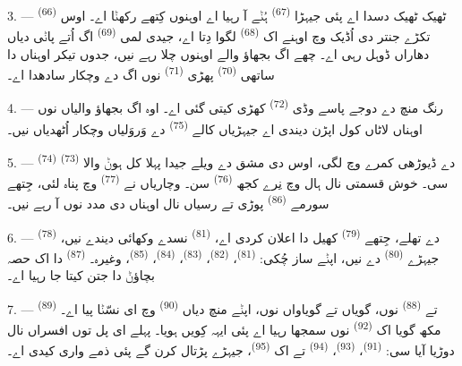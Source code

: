 3. ---  \textsuperscript{(66)} ٹھیک ٹھیک دسدا اے پئی جیہڑا
 \textsuperscript{(67)} ہُݨے آ رہیا اے اوہنوں کِتھے رکھݨا اے۔ اوس
تکڑے جنتر دی اُڈیک وچ اوہنے اک  \textsuperscript{(68)} لگوا دِتا
اے، جیدی لمی  \textsuperscript{(69)} اگ اُتے پاݨی دیاں دھاراں ڈوہل رہی
اے۔ چھے اگ بجھاؤ والے اوہنوں چلا رہے نیں، جدوں تیکر اوہناں دا ساتھی 
\textsuperscript{(70)} پھڑی  \textsuperscript{(71)} نوں اگ دے وچکار
سادھدا اے۔

4. --- رنگ منچ دے دوجے پاسے وڈی  \textsuperscript{(72)} کھڑی کیتی گئی
اے۔ اوہ اگ بجھاؤ والیاں نوں اوہناں لاٹاں کول اپڑن دیندی اے جیہڑیاں کالے
 \textsuperscript{(75)} دے وَروَلیاں وچکار اُٹھدیاں نیں۔

\VUsaut{5.0mm}
\VUsaut{3.4mm}

5. ---  \textsuperscript{(74)}  \textsuperscript{(73)} دے
ڈیوڑھی کمرے وچ لگی، اوس  دی مشق دے ویلے جیدا پہلا  کل
ہوݨ والا سی۔ خوش قسمتی نال ہال وچ نِرے کجھ  \textsuperscript{(76)}
سن۔ وچاریاں نے  \textsuperscript{(77)} وچ پناہ لئی، جِتھے سورمے
 \textsuperscript{(86)} پوڑی تے رسیاں نال اوہناں دی مدد نوں آ
رہے نیں۔

6. ---  \textsuperscript{(78)} دے تھلے، جِتھے
 \textsuperscript{(79)} کھیل دا اعلان کردی اے،
 \textsuperscript{(81)} نسدے وکھائی دیندے نیں، جیہڑے
 \textsuperscript{(80)} دے نیں، اپݨے ساز چُکی:
 \textsuperscript{(81)}،  \textsuperscript{(82)}،
 \textsuperscript{(83)}،  \textsuperscript{(84)}،
 \textsuperscript{(85)}، وغیرہ۔ 
\textsuperscript{(87)} دا اک حصہ بچاؤݨ دا جتن کیتا جا رہیا اے۔

7. ---  \textsuperscript{(89)} تے 
\textsuperscript{(88)} نوں، گویاں تے گویاواں نوں، اپݨے منچ دیاں 
\textsuperscript{(90)} وچ ای نسّݨا پیا اے۔ مکھ گویا اک 
\textsuperscript{(92)} نوں سمجھا رہیا اے پئی ایہہ کِویں ہویا۔ 
پہلے ای پل توں افسراں نال دوڑیا آیا سی:  \textsuperscript{(91)}،
 \textsuperscript{(93)}،  \textsuperscript{(94)} تے اک
 \textsuperscript{(95)}، جیہڑے پڑتال کرن گے پئی ذمے واری کیدی اے۔
\VUsaut{6.0mm}
\VUfilet{22mm}
